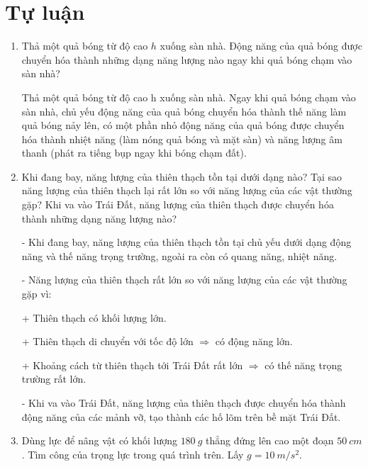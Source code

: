 \section{Tự luận}
\begin{enumerate}[label=\bfseries Câu \arabic*:, leftmargin=1.5cm]
	\item {}
	
	
	{
		Thả một quả bóng từ độ cao $h$ xuống sàn nhà. Động năng của quả bóng được chuyển hóa thành những dạng năng lượng nào ngay khi quả bóng chạm vào sàn nhà?
	}
	
	\hideall
	{	
		Thả một quả bóng từ độ cao h xuống sàn nhà. Ngay khi quả bóng chạm vào sàn nhà, chủ yếu động năng của quả bóng chuyển hóa thành thế năng làm quả bóng nảy lên, có một phần nhỏ động năng của quả bóng được chuyển hóa thành nhiệt năng (làm nóng quả bóng và mặt sàn) và năng lượng âm thanh (phát ra tiếng bụp ngay khi bóng chạm đất).
		
		
	}
		
		\item {}
		
		
		{
			Khi đang bay, năng lượng của thiên thạch tồn tại dưới dạng nào? Tại sao năng lượng của thiên thạch lại rất lớn so với năng lượng của các vật thường gặp? Khi va vào Trái Đất, năng lượng của thiên thạch được chuyển hóa thành những dạng năng lượng nào?
		}
		
		\hideall
		{	
			- Khi đang bay, năng lượng của thiên thạch tồn tại chủ yếu dưới dạng động năng và thế năng trọng trường, ngoài ra còn có quang năng, nhiệt năng.
			
			- Năng lượng của thiên thạch rất lớn so với năng lượng của các vật thường gặp vì:
			
			+ Thiên thạch có khối lượng lớn.
			
			+ Thiên thạch di chuyển với tốc độ lớn $\Rightarrow$ có động năng lớn.
			
			+ Khoảng cách từ thiên thạch tới Trái Đất rất lớn $\Rightarrow$ có thế năng trọng trường rất lớn.
			
			- Khi va vào Trái Đất, năng lượng của thiên thạch được chuyển hóa thành động năng của các mảnh vỡ, tạo thành các hố lõm trên bề mặt Trái Đất.
		}
		
	\item {}
	
	
	{
		Dùng lực để nâng vật có khối lượng $\SI{180}{g}$ thẳng đứng lên cao một đoạn $\SI{50}{cm}$. Tìm công của trọng lực trong quá trình trên. Lấy $g=\SI{10}{m/s^2}$.
	}
	

\end{enumerate}
